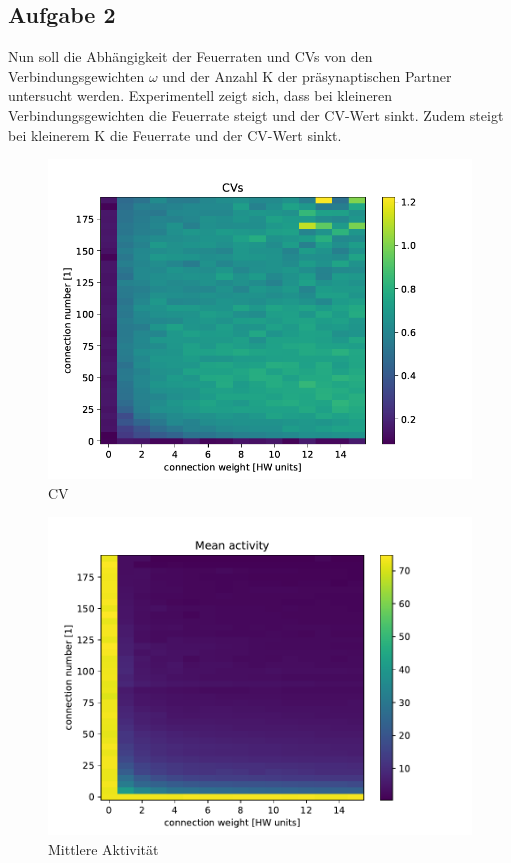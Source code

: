 \documentclass[10pt,a4paper]{scrartcl}
\begin{document}
\subsection{Aufgabe 2}

Nun soll die Abhängigkeit der Feuerraten und CVs von den Verbindungsgewichten $\omega$ und der Anzahl K der präsynaptischen Partner untersucht werden. Experimentell zeigt sich, dass bei kleineren Verbindungsgewichten die Feuerrate steigt und der CV-Wert sinkt. Zudem steigt bei kleinerem K die Feuerrate und der CV-Wert sinkt.
\begin{figure} [ht]
\begin{center}
\label{fig:abb39}
\caption{CV}
\includegraphics[scale=0.35]{pictures/CVs.pdf}
\end{center}
\end{figure}

\begin{figure} [ht]
\begin{center}
\label{fig:abb40}
\caption{Mittlere Aktivität}
\includegraphics[scale=0.45]{pictures/mean_activity.pdf}
\end{center}
\end{figure}
\end{document}
